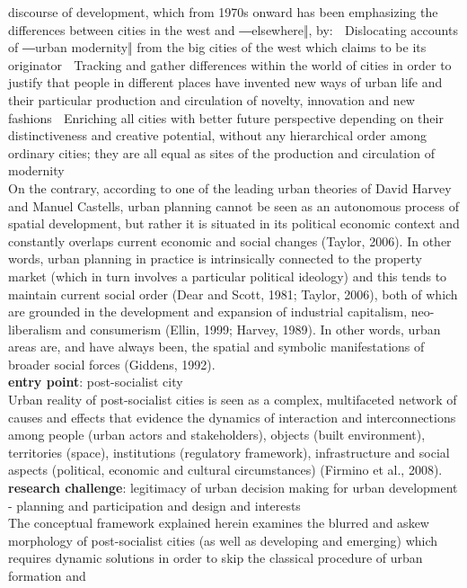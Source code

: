 \documentclass[11pt]{report}
\begin{document}
discourse of development, which from 1970s onward has been emphasizing the differences between 
cities in the west and ―elsewhere‖, by: 
  Dislocating accounts of ―urban modernity‖ from the big cities of the west which claims to be its 
originator 
  Tracking  and  gather  differences  within  the  world  of  cities  in  order  to  justify  that  people  in 
different  places  have  invented  new  ways  of  urban  life  and  their  particular  production  and 
circulation of novelty, innovation and new fashions 
  Enriching  all  cities  with  better  future  perspective  depending  on  their  distinctiveness  and 
creative potential, without any hierarchical order among ordinary cities; they are all equal as 
sites of the production and circulation of modernity 
\\
On the contrary, according to one of the leading urban theories of David Harvey and Manuel Castells, urban planning cannot be seen as an autonomous process of spatial development, but rather it is situated in its political economic context and constantly overlaps current economic and social changes  (Taylor, 2006). In other words, urban planning in practice is intrinsically connected to the property market (which in turn involves a particular political ideology) and this tends to maintain current social order (Dear and Scott, 1981; Taylor, 2006), both of which are grounded in the development and expansion of industrial capitalism, neo-liberalism and consumerism (Ellin, 1999; Harvey, 1989). In other words, urban areas are, and have always been, the spatial and symbolic manifestations of broader social forces (Giddens, 1992).
\\
\textbf{entry point}: post-socialist city
\\
Urban reality of post-socialist cities is seen as a complex, multifaceted network of causes and effects that evidence  the dynamics of  interaction  and  interconnections  among  people  (urban  actors  and  stakeholders),  objects  (built  environment), territories (space), institutions (regulatory framework), infrastructure and social  aspects (political, economic and cultural circumstances) (Firmino et al., 2008).
\\
\textbf{research challenge}: legitimacy of urban decision making for urban development - planning and participation and design and interests
\\
The  conceptual  framework  explained  herein  examines  the  blurred  and  askew  morphology of  post-socialist  cities (as well as developing and emerging) which  requires  dynamic  solutions  in  order  to  skip  the  classical  procedure  of  urban  formation  and 
\end{document}
